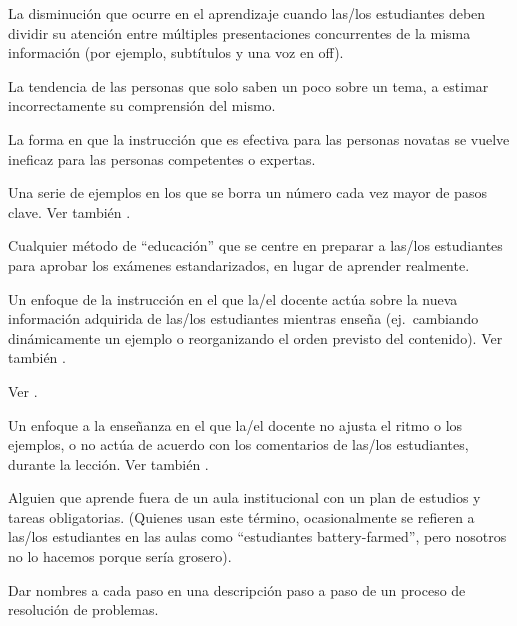 \begin{description}
 La disminución que ocurre
en el aprendizaje cuando las/los estudiantes deben dividir su atención entre múltiples 
presentaciones concurrentes de la misma información (por ejemplo, subtítulos y una voz en off).



 La tendencia de las personas que solo 
saben un poco sobre un tema, a estimar incorrectamente su comprensión del mismo.

 La forma en que
la instrucción que es efectiva para las personas novatas se vuelve ineficaz para
las personas competentes o expertas.

 Una serie de ejemplos en los que
se borra un número cada vez mayor de pasos clave. Ver
también .

 Cualquier método de ``educación''
que se centre en preparar a las/los estudiantes para aprobar los exámenes estandarizados, en lugar de aprender realmente.

 Un enfoque de la instrucción en el que la/el docente
actúa sobre la nueva información adquirida de las/los estudiantes mientras enseña (ej.\ cambiando
dinámicamente un ejemplo o reorganizando el orden previsto del contenido).
Ver también .

 Ver .

 Un enfoque a la enseñanza en el que la/el docente no ajusta el ritmo o los ejemplos, 
o no actúa de acuerdo con los comentarios de las/los estudiantes, durante la lección.  
Ver también .

 Alguien que aprende fuera de un aula institucional 
con un plan de estudios y tareas obligatorias. 
(Quienes usan este término, ocasionalmente se refieren a las/los estudiantes en las aulas 
como ``estudiantes battery-farmed'', pero nosotros no lo hacemos porque sería grosero).

 Dar nombres a cada paso en una descripción paso a paso 
de un proceso de resolución de problemas.


\end{description}
